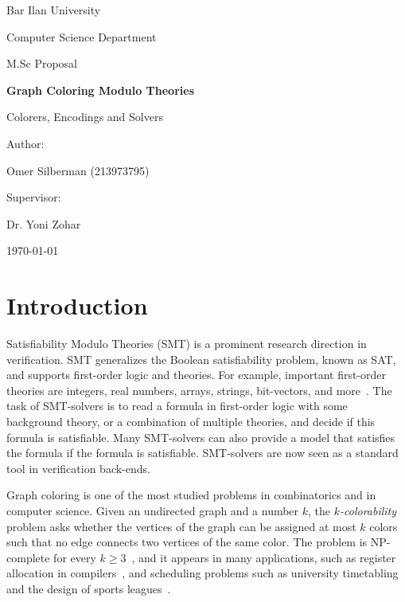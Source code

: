 \documentclass[12pt,a4paper]{article}
\theoremstyle{definition}
\begin{document}
\begin{titlepage}
  \centering
  {\Large Bar Ilan University\par}
  \vspace{0.6cm}
  {\large Computer Science Department\par}
  {\large M.Sc Proposal\par}
  \vspace{3cm}
  {\huge\bfseries Graph Coloring Modulo Theories\par}
  \vspace{0.5cm}
  {\Large Colorers, Encodings and Solvers\par}
  \vspace{3cm}
  {\large Author:\par}
  {\large Omer Silberman (213973795)\par}
  \vspace{1.5cm}
  {\large Supervisor:\par}
  {\large Dr. Yoni Zohar\par}
  \vfill
  {\large \today\par}
\end{titlepage}

\section{Introduction}

Satisfiability Modulo Theories (SMT) is a prominent research direction in
verification. SMT generalizes the Boolean satisfiability problem, known as SAT,
and supports first-order logic and theories. For example, important first-order
theories are integers, real numbers, arrays, strings, bit-vectors, and
more~\cite{BarrettST10,ZhengZG13,ReynoldsB16}. The task of SMT-solvers is to read a
formula in first-order logic with some background theory, or a combination of
multiple theories, and decide if this formula is satisfiable. Many SMT-solvers
can also provide a model that satisfies the formula if the formula is
satisfiable. SMT-solvers are now seen as a standard tool in verification
back-ends.

Graph coloring is one of the most studied problems in combinatorics and in
computer science. Given an undirected graph and a number $k$, the
\emph{$k$-colorability} problem asks whether the vertices of the graph can be
assigned at most $k$ colors such that no edge connects two vertices of the same
color. The problem is NP-complete for every $k \geq 3$~\cite{Karp72,GareyJ79},
and it appears in many applications, such as register allocation in
compilers~\cite{ChaitinACCHM81,Chaitin82}, and scheduling problems such as
university timetabling and the design of sports
leagues~\cite{WelshP67,Lewis21}.
\end{document}

